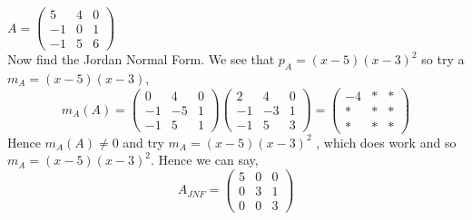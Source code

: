\documentclass{article}
\begin{document}
\begin{itemize}
\begin{center}
\begin{minipage}{0.32\textwidth}
\begin{tikzpicture}
      \end{tikzpicture}
    \end{minipage}
    \begin{minipage}{0.32\textwidth}
    \end{minipage}
  \end{center}
\end{itemize}

\begin{eg}
  $\displaystyle{A = \begin{pmatrix}
    5 & 4 & 0 \\ -1 & 0 & 1 \\ -1 & 5 & 6
  \end{pmatrix}}$ \\
  Now find the Jordan Normal Form. We see that $p_A = (x - 5)(x - 3)^2$ so try a $m_A = (x - 5)(x - 3)$,
  $$ m_A(A) = \begin{pmatrix}
    0 & 4 & 0 \\ -1 & -5 & 1 \\ -1 & 5 & 1
  \end{pmatrix}\begin{pmatrix}
    2 & 4 & 0 \\ -1 & -3 & 1 \\ -1 & 5 & 3
  \end{pmatrix} = \begin{pmatrix}
    -4 & * & * \\ *&*&* \\ *&*&*
  \end{pmatrix} $$
  Hence $m_A(A) \ne 0$ and try $m_A = (x - 5)(x - 3)^2$ , which does work and so $m_A = (x - 5)(x - 3)^2$. Hence we can say,
  $$ A_{JNF} = \begin{pmatrix}
    5 &0&0\\
    0&3&1\\
    0&0&3
  \end{pmatrix} $$
\end{eg}
\end{document}
